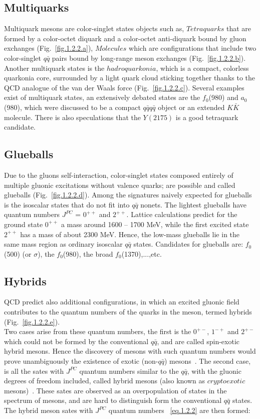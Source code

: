 \subsection{Multiquarks}
Multiquark mesons are color-singlet states objects such as, $Tetraquarks$ that are formed by a color-octet diquark and a color-octet anti-diquark bound by gluon exchanges (Fig.~\ref{fig.1.2.2.a}), $Molecules$ which are configurations that include two color-singlet $q\bar{q}$ pairs bound by long-range meson exchanges (Fig.~\ref{fig.1.2.2.b}). Another multiquark states is the $hadroquarkonia$, which is a compact, colorless quarkonia core, surrounded by a light quark cloud sticking together thanks to the QCD analogue of the van der Waals force (Fig.~\ref{fig.1.2.2.c}). Several examples exist of multiquark states, an extensively debated states are the $f_0$(980) and $a_0$(980), which were discussed to be a compact $q\bar{q}$$q\bar{q}$ object or an extended $K\bar{K}$ molecule. There is also speculations that the $Y(2175)$ is a good tetraquark candidate.

\subsection{Glueballs}
Due to the gluons self-interaction, color-singlet states composed entirely of multiple gluonic excitations without valence quarks; are possible and called glueballs (Fig.~\ref{fig.1.2.2.d}). Among the signatures naively expected for glueballs is the isoscalar states that do not fit into $q\bar{q}$ nonets. The lightest glueballs have quantum numbers
$J^{PC}$ = $0^{++}$ and $2^{++}$. Lattice calculations predict for the ground state $0^{++}$ a mass around 1600 – 1700 MeV, while the first excited state $2^{++}$ has a mass of about 2300 MeV. Hence, the low-mass glueballs lie in the same mass region as ordinary isoscalar $q\bar{q}$ states. Candidates for glueballs are: $f_0$(500) (or $\sigma$), the $f_0$(980), the broad $f_0$(1370),...,etc.

\subsection{Hybrids}
QCD predict also additional configurations, in which an excited gluonic field contributes to the quantum numbers of the quarks in the meson, termed hybrids (Fig.~\ref{fig.1.2.2.e}).\\
Two cases arise from these quantum numbers, the first is the $0^{+-}$, $1^{-+}$ and $2^{+-}$ which could not be formed by the conventional $q\bar{q}$, and are called spin-exotic hybrid mesons. Hence the discovery of mesons with such quantum numbers would prove unambiguously the existence of exotic (non-$q\bar{q}$) mesons~\cite{13}. The second case, is all the sates with $J^{PC}$ quantum numbers similar to the $q\bar{q}$, with the gluonic degrees of freedom included, called hybrid mesons (also known as $cryptoexotic$ mesons)~\cite{9}. These sates are observed as an overpopulation of states in the spectrum of mesons, and are hard to distinguish form the conventional $q\bar{q}$ states. The hybrid meson sates with $J^{PC}$ quantum numbers ~\ref{eq.1.2.2} are then formed:

